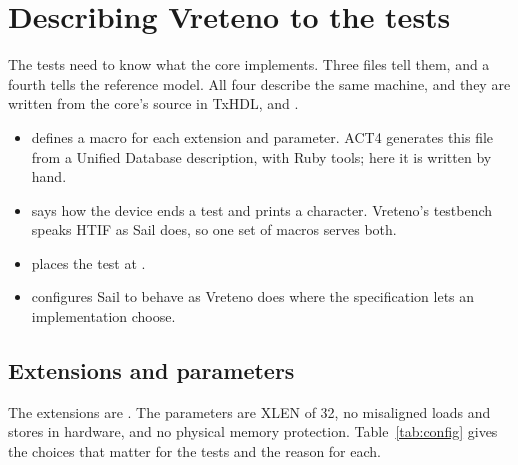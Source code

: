 \section{Describing Vreteno to the tests}
\label{sec:config}

The tests need to know what the core implements. Three files tell
them, and a fourth tells the reference model. All four describe the
same machine, and they are written from the core's source in TxHDL,
 and .

\begin{itemize}
\item {} defines a macro for each extension and
parameter. ACT4 generates this file from a Unified Database
description, with Ruby tools; here it is written by hand.
\item {} says how the device ends a test and
prints a character. Vreteno's testbench speaks HTIF as Sail does, so
one set of macros serves both.
\item {} places the test at .
\item {} configures Sail to behave as Vreteno does where
the specification lets an implementation choose.
\end{itemize}

\subsection{Extensions and parameters}

The extensions are \Extensions. The parameters are XLEN of 32, no
misaligned loads and stores in hardware, and no physical memory
protection. Table~\ref{tab:config} gives the choices that matter for
the tests and the reason for each.

